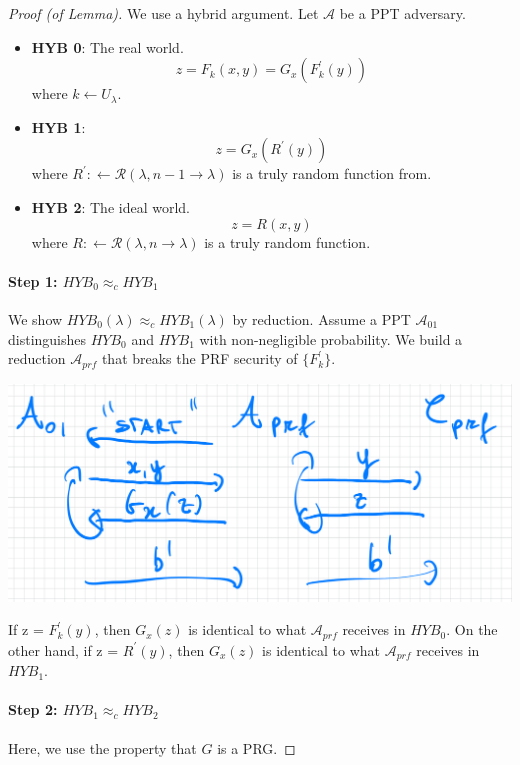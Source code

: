 \documentclass[11pt, a4paper]{article}
\begin{document}
\begin{proof}[Proof (of Lemma)] 
We use a hybrid argument. Let $\mathcal{A}$ be a PPT adversary.

\begin{itemize}
    \item \textbf{HYB 0}: The real world. 
    $$ z = F_{k}(x,y) = G_{x}(F_{k}^{'}(y)) $$ 
    where $k \leftarrow U_{\lambda}$. 
    
    \item \textbf{HYB 1}: 
    $$ z = G_{x}(R^{'}(y)) $$ 
    where $R^{'}: \leftarrow \mathcal{R}(\lambda,n-1 \rightarrow \lambda)$ is a truly random function from.
    
    \item \textbf{HYB 2}: The ideal world. 
    $$ z = R(x,y) $$ 
    where $R: \leftarrow \mathcal{R}(\lambda,n \rightarrow \lambda)$ is a truly random function.
\end{itemize}

\paragraph{Step 1: $HYB_0 \approx_c HYB_1$} 
We show $HYB_{0}(\lambda)\approx_{c}HYB_{1}(\lambda)$ by reduction. 
Assume a PPT $\mathcal{A}_{01}$ distinguishes $HYB_0$ and $HYB_1$ with non-negligible probability. 
We build a reduction $\mathcal{A}_{prf}$ that breaks the PRF security of $\{F_{k}^{'}\}$. 
\begin{center}
    \includegraphics[scale=0.4]{img/Comp_sec/Aprf.png}
\end{center}
If z = $F_{k}^{'}(y)$, then $G_{x}(z)$ is identical to what $\mathcal{A}_{prf}$ receives in $HYB_0$. On the other hand, if z = $R^{'}(y)$, then $G_{x}(z)$ is identical to what $\mathcal{A}_{prf}$ receives in $HYB_1$.\\
\paragraph{Step 2: $HYB_1 \approx_c HYB_2$} 
Here, we use the property that $G$ is a PRG. 


\end{proof}
\end{document}
